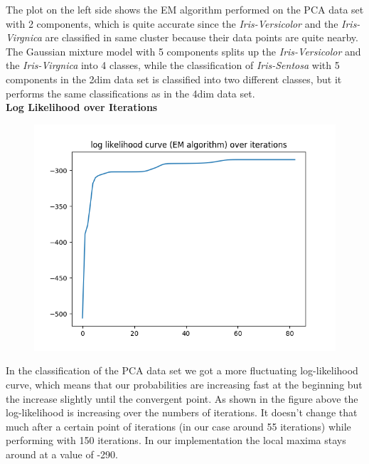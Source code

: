 \documentclass[a4paper]{article}
\begin{document}
\noindent
The plot on the left side shows the EM algorithm performed on the PCA data set with 2 components, which is quite accurate since the \textit{Iris-Versicolor} and the \textit{Iris-Virgnica} are classified in same cluster because their data points are quite nearby. The Gaussian mixture model with 5 components splits up the \textit{Iris-Versicolor} and the \textit{Iris-Virgnica} into 4 classes, while the classification of \textit{Iris-Sentosa} with 5 components in the 2dim data set is classified into two different classes, but it performs the same classifications as in the 4dim data set. \\

\noindent
{\large \textbf{Log Likelihood over Iterations}} \\


\begin{figure}[htp]
\centering
\includegraphics[scale=0.5]{plots/LL_scenario3_cmpnt3.png}
  \label{fig:17}
\end{figure}

\noindent
In the classification of the PCA data set we got a more fluctuating log-likelihood curve, which means that our probabilities are increasing fast at the beginning but the increase slightly until the convergent point. As shown in the figure above the log-likelihood is increasing over the numbers of iterations. It doesn't change that much after a certain point of iterations (in our case around 55 iterations) while performing with 150 iterations. In our implementation the local maxima stays around at a value of -290.\newline \newline
\end{document}
